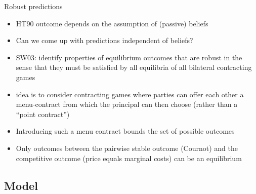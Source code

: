 \documentclass[11pt,english]{beamer}
\begin{document}
\begin{frame}{Robust predictions}
  \begin{itemize}
  \item HT90 outcome depends on the assumption of (passive) beliefs
  \item Can we come up with predictions independent of beliefs?
  \item SW03: identify properties of equilibrium outcomes that are
    robust in the sense that they must be satisfied by all equilibria
    of all bilateral contracting games
  \item idea is to consider contracting games where parties can offer
    each other a menu-contract from which the principal can then
    choose (rather than a ``point contract'')
  \item Introducing such a menu contract bounds the set of possible outcomes
  \item Only outcomes between the pairwise stable outcome (Cournot)
    and the competitive outcome (price equals marginal costs) can be
    an equilibrium
  \end{itemize}
\end{frame}

\subsection{Model}
\end{document}
